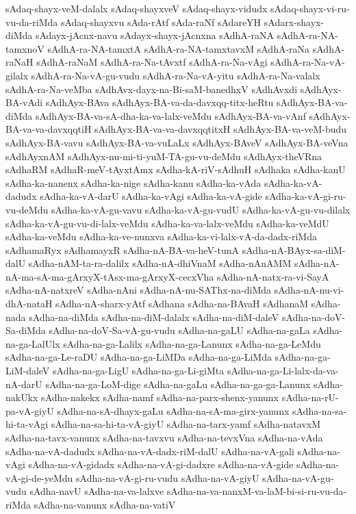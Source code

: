 {sAdaq-shayx-veM-dalalx
sAdaq-shayxveV
sAdaq-shayx-vidudx
sAdaq-shayx-vi-ru-vu-da-riMda
sAdaq-shayxvu
sAda-rAtf
sAda-raNf
sAdareYH
sAdarx-shayx-diMda
sAdayx-jAcnx-navu
sAdayx-shayx-jAcnxna
sAdhA-raNA
sAdhA-ra-NA-tamxnoV
sAdhA-ra-NA-tamxtA
sAdhA-ra-NA-tamxtavxM
sAdhA-raNa
sAdhA-raNaH
sAdhA-raNaM
sAdhA-ra-Na-tAvxtf
sAdhA-ra-Na-vAgi
sAdhA-ra-Na-vA-gilalx
sAdhA-ra-Na-vA-gu-vudu
sAdhA-ra-Na-vA-yitu
sAdhA-ra-Na-valalx
sAdhA-ra-Na-veMba
sAdhAvx-dayx-na-Bi-saM-banedhxV
sAdhAvxdi
sAdhAyx-BA-vAdi
sAdhAyx-BAva
sAdhAyx-BA-va-da-davxqq-titx-heRtu
sAdhAyx-BA-va-diMda
sAdhAyx-BA-va-sA-dha-ka-va-lalx-veMdu
sAdhAyx-BA-va-vAnf
sAdhAyx-BA-va-va-davxqqtiH
sAdhAyx-BA-va-va-davxqqtitxH
sAdhAyx-BA-va-veM-budu
sAdhAyx-BA-vavu
sAdhAyx-BA-va-vuLaLx
sAdhAyx-BAveV
sAdhAyx-BA-veVna
sAdhAyxnAM
sAdhAyx-nu-mi-ti-yuM-TA-gu-vu-deMdu
sAdhAyx-theVRna
sAdhaRM
sAdhaR-meV-tAyxtAmx
sAdha-kA-riV-sAdhuH
sAdhaka
sAdha-kanU
sAdha-ka-nanenx
sAdha-ka-nige
sAdha-kanu
sAdha-ka-vAda
sAdha-ka-vA-dadudx
sAdha-ka-vA-darU
sAdha-ka-vAgi
sAdha-ka-vA-gide
sAdha-ka-vA-gi-ru-vu-deMdu
sAdha-ka-vA-gu-vavu
sAdha-ka-vA-gu-vudU
sAdha-ka-vA-gu-vu-dilalx
sAdha-ka-vA-gu-vu-di-lalx-veMdu
sAdha-ka-va-lalx-veMdu
sAdha-ka-veMdU
sAdha-ka-veMdu
sAdha-ka-ve-nunxva
sAdha-ka-vi-lalx-vA-da-dadx-riMda
sAdhamaRyx
sAdhamayxR
sAdha-nA-BA-va-heV-tunA
sAdha-nA-BAyx-sa-diM-dalU
sAdha-nAM-ta-ra-dalilx
sAdha-nA-dhiVnaM
sAdha-nAnAMM
sAdha-nA-nA-ma-sA-ma-gArxyX-tAsx-ma-gArxyX-cecxVha
sAdha-nA-natx-ra-vi-SayA
sAdha-nA-natxreV
sAdha-nAni
sAdha-nA-nu-SAThx-na-diMda
sAdha-nA-nu-vi-dhA-nataH
sAdha-nA-sharx-yAtf
sAdhana
sAdha-na-BAvaH
sAdhanaM
sAdha-nada
sAdha-na-diMda
sAdha-na-diM-dalalx
sAdha-na-diM-daleV
sAdha-na-doV-Sa-diMda
sAdha-na-doV-Sa-vA-gu-vudu
sAdha-na-gaLU
sAdha-na-gaLa
sAdha-na-ga-LalUlx
sAdha-na-ga-Lalilx
sAdha-na-ga-Lanunx
sAdha-na-ga-LeMdu
sAdha-na-ga-Le-raDU
sAdha-na-ga-LiMDa
sAdha-na-ga-LiMda
sAdha-na-ga-LiM-daleV
sAdha-na-ga-LigU
sAdha-na-ga-Li-giMta
sAdha-na-ga-Li-lalx-da-va-nA-darU
sAdha-na-ga-LoM-dige
sAdha-na-gaLu
sAdha-na-ga-ga-Lanunx
sAdha-nakUkx
sAdha-nakekx
sAdha-namf
sAdha-na-parx-shenx-yanunx
sAdha-na-rU-pa-vA-giyU
sAdha-na-sA-dhayx-gaLu
sAdha-na-sA-ma-girx-yanunx
sAdha-na-sa-hi-ta-vAgi
sAdha-na-sa-hi-ta-vA-giyU
sAdha-na-tarx-yamf
sAdha-natavxM
sAdha-na-tavx-vanunx
sAdha-na-tavxvu
sAdha-na-tevxVna
sAdha-na-vAda
sAdha-na-vA-dadudx
sAdha-na-vA-dadx-riM-dalU
sAdha-na-vA-gali
sAdha-na-vAgi
sAdha-na-vA-gidadx
sAdha-na-vA-gi-dadxre
sAdha-na-vA-gide
sAdha-na-vA-gi-de-yeMdu
sAdha-na-vA-gi-ru-vudu
sAdha-na-vA-giyU
sAdha-na-vA-gu-vudu
sAdha-navU
sAdha-na-va-lalxve
sAdha-na-va-nanxM-va-laM-bi-si-ru-vu-da-riMda
sAdha-na-vanunx
sAdha-na-vatiV
}
